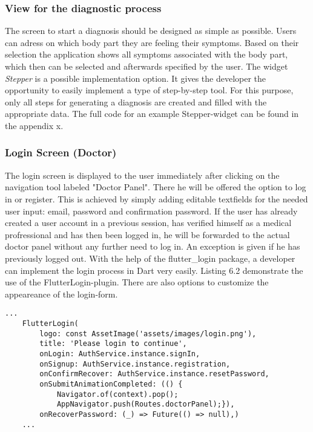 \subsubsection{\textbf{View for the diagnostic process}}
The screen to start a diagnosis should be designed as simple as possible. Users can adress on which body part they are feeling their symptoms. Based on their selection the application shows all symptoms associated with the body part, which then can be selected and afterwards specified by the user. The widget \textit{Stepper} is a possible implementation option. It gives the developer the opportunity to easily implement a type of step-by-step tool. For this purpose, only all steps for generating a diagnosis are created and filled with the appropriate data. The full code for an example Stepper-widget can be found in the appendix x.

\subsubsection{\textbf{Login Screen (Doctor)}}
The login screen is displayed to the user immediately after clicking on the navigation tool labeled "Doctor Panel". There he will be offered the option to log in or register. This is achieved by simply adding editable textfields for the needed user input: email, password and confirmation password. If the user has already created a user account in a previous session, has verified himself as a medical profressional and has then been logged in, he will be forwarded to the actual doctor panel without any further need to log in. An exception is given if he has previously logged out. With the help of the flutter\_login package, a developer can implement the login process in Dart very easily. Listing 6.2 demonstrate the use of the FlutterLogin-plugin. There are also options to customize the appeareance of the login-form.
	\scriptsize
\begin{lstlisting}[caption=Stepper for Body Part Selection]
	...
	FlutterLogin(
		logo: const AssetImage('assets/images/login.png'),
		title: 'Please login to continue',
		onLogin: AuthService.instance.signIn,
		onSignup: AuthService.instance.registration,
		onConfirmRecover: AuthService.instance.resetPassword,
		onSubmitAnimationCompleted: (() {
			Navigator.of(context).pop();
			AppNavigator.push(Routes.doctorPanel);}),
		onRecoverPassword: (_) => Future(() => null),)
	...
\end{lstlisting}
\normalsize
